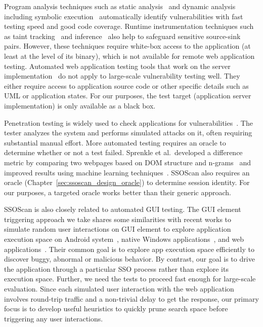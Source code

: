  Program analysis techniques such as static analysis~\cite{Ball:2002:SLP:503272.503274} and dynamic analysis including symbolic execution~\cite{Cadar:2005:EGT:2156342.2156345,Kudzu} automatically identify vulnerabilities with fast testing speed and good code coverage.  Runtime instrumentation techniques such as taint tracking~\cite{Nentwich07cross-sitescripting} and inference~\cite{DBLP:conf:ndss:Sekar09} also help to safeguard sensitive source-sink pairs.  However, these techniques require white-box access to the application (at least at the level of its binary), which is not available for remote web application testing.  Automated web application testing tools that work on the server implementation~\cite{1167787,Ricca:2001:ATW:381473.381476,Alshahwan:2011:AWA:2190078.2190141} do not apply to large-scale vulnerability testing well.  They either require access to application source code or other specific details such as UML or application states.  For our purposes, the test target (application server implementation) is only available as a black box.

 Penetration testing is widely used to check applications for vulnerabilities~\cite{whitehat,redspin}.  The tester analyzes the system and performs simulated attacks on it, often requiring substantial manual effort.  More automated testing requires an oracle to determine whether or not a test failed.  Sprenkle et al.\ developed a difference metric by comparing two webpages based on DOM structure and n-grams~\cite{Sprenkle:2005:ARF:1101908.1101947} and improved results using machine learning techniques~\cite{Sprenkle07learningeffective}.  SSOScan also requires an oracle (Chapter~\ref{sec:ssoscan_design_oracle}) to determine session identity. For our purposes, a targeted oracle works better than their generic approach.

 SSOScan is also closely related to automated GUI testing.  The GUI element triggering approach we take shares some similarities with recent works to simulate random user interactions on GUI element to explore application execution space on Android system~\cite{Rastogi:2013:AAS:2435349.2435379}, native Windows applications~\cite{Xie:2006:MTC:1172962.1172990}, and web applications~\cite{Benedikt02veriweb:automatically,Huang:2003:WAS:775152.775174}.  Their common goal is to explore app execution space efficiently to discover buggy, abnormal or malicious behavior.  By contrast, our goal is to drive the application through a particular SSO process rather than explore its execution space.  Further, we need the tests to proceed fast enough for large-scale evaluation.  Since each simulated user interaction with the web application involves round-trip traffic and a non-trivial delay to get the response, our primary focus is to develop useful heuristics to quickly prune search space before triggering any user interactions.

